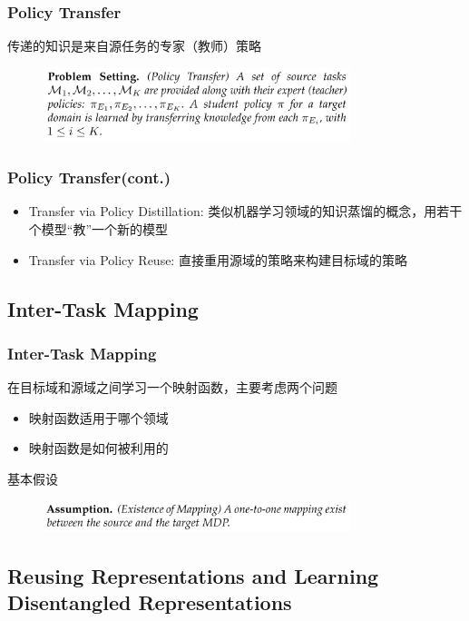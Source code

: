 \documentclass[aspectratio=169]{beamer}
\begin{document}
\begin{frame}
  \frametitle{Policy Transfer}
  传递的知识是来自源任务的专家（教师）策略
  \begin{figure}
    \centering
    \includegraphics[width=0.8\textwidth]{imgs/policy_transfer.png}
  \end{figure}
\end{frame}

\begin{frame}
  \frametitle{Policy Transfer(cont.)}
  \begin{itemize}
    \item Transfer via Policy Distillation: 类似机器学习领域的知识蒸馏的概念，用若干个模型“教”一个新的模型
    \item Transfer via Policy Reuse: 直接重用源域的策略来构建目标域的策略
  \end{itemize}
\end{frame}

\subsection{Inter-Task Mapping}

\begin{frame}
  \frametitle{Inter-Task Mapping}
  在目标域和源域之间学习一个映射函数，主要考虑两个问题
  \begin{itemize}
    \item 映射函数适用于哪个领域
    \item 映射函数是如何被利用的
  \end{itemize}
  基本假设
  \begin{figure}
    \centering
    \includegraphics[width=0.8\textwidth]{imgs/existence_of_mapping.png}
  \end{figure}
\end{frame}

\subsection{Reusing Representations and Learning Disentangled Representations}
\end{document}
